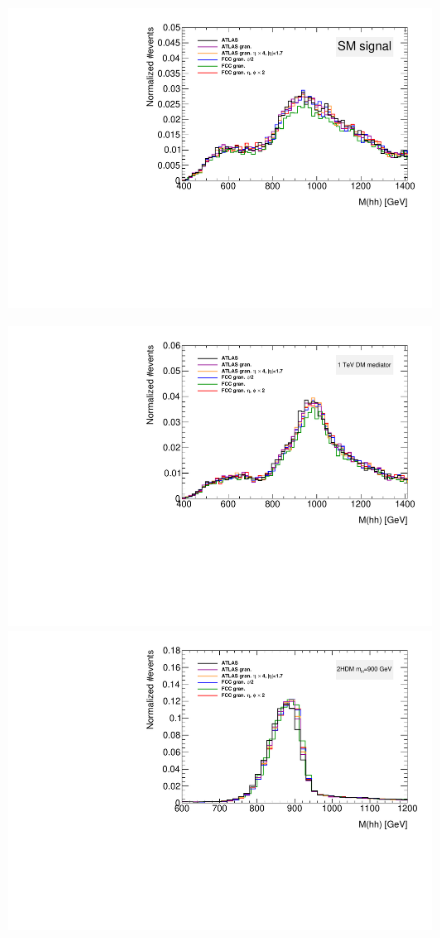 \begin{figure}
	\centering
	\includegraphics[width=0.5\linewidth]{./Figures/Mhh_after.pdf}
	\caption{}
	\label{fig:CompGran_Mhh}
\end{figure}

\begin{figure}
	\centering
	\begin{minipage}[t]{.5\textwidth}
		\centering
		\includegraphics[trim={.55cm 0 0 0},clip,width=\linewidth]{./Figures/MhhX_after.pdf}
	\end{minipage}%
	\begin{minipage}[t]{.5\textwidth}
		\centering
		\includegraphics[trim={0 0 .55cm 0},clip,width=\linewidth]{./Figures/Mhh2HDM_after.pdf}
	\end{minipage}
	

\end{figure}
